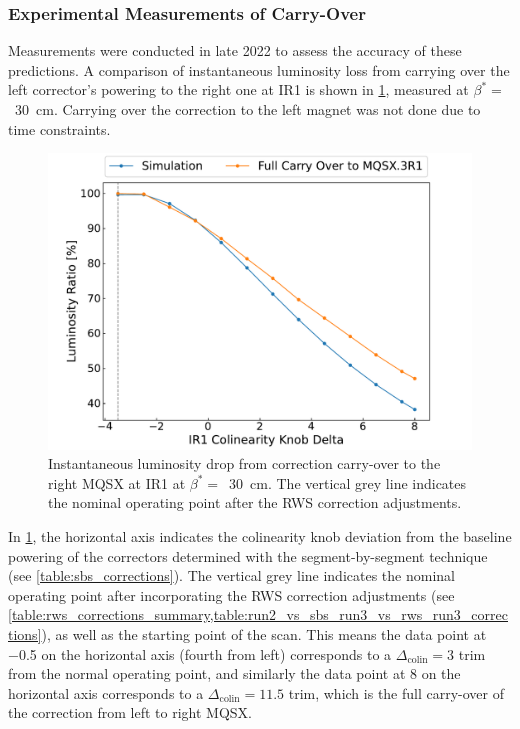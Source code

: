 \subsubsection*{Experimental Measurements of Carry-Over}

Measurements were conducted in late \num{2022} to assess the accuracy of these predictions.
A comparison of instantaneous luminosity loss from carrying over the left corrector's powering to the right one at IR\num{1} is shown in \cref{figure:ir1_carry_over_vs_simulation}, measured at \(\beta^{\ast} =\)~\qty{30}{\centi\meter}.
Carrying over the correction to the left magnet was not done due to time constraints.

\begin{figure}[!htb]
    \centering
    \includegraphics*[width=\textwidth]{Figures/IR_Coupling_Correction/ir1_scan_vs_simu.pdf}
    \caption{Instantaneous luminosity drop from correction carry-over to the right MQSX at IR\num{1} at \(\beta^{\ast} =\)~\qty{30}{\centi\meter}. The vertical grey line indicates the nominal operating point after the RWS correction adjustments.}
    \label{figure:ir1_carry_over_vs_simulation}
\end{figure}
\break

In \cref{figure:ir1_carry_over_vs_simulation}, the horizontal axis indicates the colinearity knob deviation from the baseline powering of the correctors determined with the segment-by-segment technique (see \cref{table:sbs_corrections}).
The vertical grey line indicates the nominal operating point after incorporating the \gls{RWS} correction adjustments (see \cref{table:rws_corrections_summary,table:run2_vs_sbs_run3_vs_rws_run3_corrections}), as well as the starting point of the scan.
This means the data point at \num{-0.5} on the horizontal axis (fourth from left) corresponds to a \(\Delta_{\mathrm{colin}} = 3\) \gls{trim} from the normal operating point, and similarly the data point at \num{8} on the horizontal axis corresponds to a \(\Delta_{\mathrm{colin}} = 11.5\) trim, which is the full carry-over of the correction from left to right MQSX.

